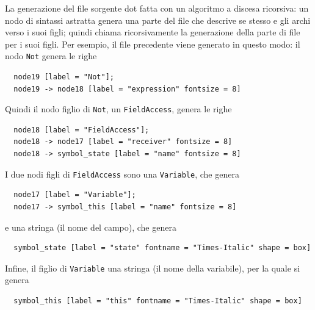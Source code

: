 La generazione del file sorgente dot \e fatta con un algoritmo
a discesa ricorsiva:
un nodo di sintassi astratta genera una parte del file
che descrive se stesso e gli archi verso i suoi figli; quindi chiama
ricorsivamente la generazione della parte di file per i suoi figli.
Per esempio, il file precedente viene generato in questo modo:
il nodo \texttt{Not} genera le righe
%
\begin{verbatim}
  node19 [label = "Not"];
  node19 -> node18 [label = "expression" fontsize = 8]
\end{verbatim}
%
Quindi il nodo figlio di \texttt{Not}, \cioe un \texttt{FieldAccess},
genera le righe
%
\begin{verbatim}
  node18 [label = "FieldAccess"];
  node18 -> node17 [label = "receiver" fontsize = 8]
  node18 -> symbol_state [label = "name" fontsize = 8]
\end{verbatim}
%
I due nodi figli di \texttt{FieldAccess} sono una \texttt{Variable}, che genera
%
\begin{verbatim}
  node17 [label = "Variable"];
  node17 -> symbol_this [label = "name" fontsize = 8]
\end{verbatim}
%
e una stringa (il nome del campo), che genera
%
\begin{verbatim}
  symbol_state [label = "state" fontname = "Times-Italic" shape = box]
\end{verbatim}
%
Infine, il figlio di \texttt{Variable} \e una stringa (il nome della variabile), per la quale
si genera
%
\begin{verbatim}
  symbol_this [label = "this" fontname = "Times-Italic" shape = box]
\end{verbatim}

